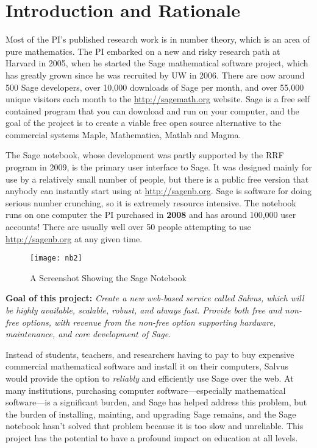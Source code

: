 \documentclass[11pt]{article}
\begin{document}
\section{Introduction and Rationale}


Most of the PI's published research work is in
number theory, which is an area of pure mathematics.  The PI embarked
on a new and risky research path at Harvard in 2005, when he started
the Sage mathematical software project, which has greatly grown since
he was recruited by UW in 2006.  There are now around 500 Sage
developers, over 10,000 downloads of Sage per month, and over 55,000
unique visitors each month to the \url{http://sagemath.org} website.
Sage is a free self contained program that you can download and run on
your computer, and the goal of the project is to create a viable free
open source alternative to the commercial systems Maple, Mathematica,
Matlab and Magma.

The Sage notebook, whose development was partly supported by the RRF
program in 2009, is the primary user interface to Sage.  It was
designed mainly for use by a relatively small number of people, but
there is a public free version that anybody can instantly start using
at \url{http://sagenb.org}.  Sage is software for doing serious number
crunching, so it is extremely resource intensive.  The notebook runs
on one computer the PI purchased in {\bf 2008} and has around 100,000
user accounts!  There are usually well over 50 people attempting to
use \url{http://sagenb.org} at any given time.

\begin{figure}[ht]
\begin{center}
\texttt{[image: nb2]}
\caption{A Screenshot Showing the Sage Notebook\label{fig:sagenb}}
\end{center}
\end{figure}

{\bf Goal of this project:} {\em Create a new web-based service called
  Salvus, which will be highly available, scalable, robust, and always
  fast.  Provide both free and non-free options, with revenue from the
  non-free option supporting hardware, maintenance, and core
  development of Sage. }

Instead of students, teachers, and researchers having to pay to buy
expensive commercial mathematical software and install it on their
computers, Salvus would provide the option to {\em reliably} and
efficiently use Sage over the web.  At many institutions, purchasing
computer software---especially mathematical software---is a
significant burden, and Sage has helped address this problem, but the
burden of installing, mainting, and upgrading Sage remains, and the
Sage notebook hasn't solved that problem because it is too slow and
unreliable.     This project has the potential to have a profound impact
on education at all levels. 
\end{document}
